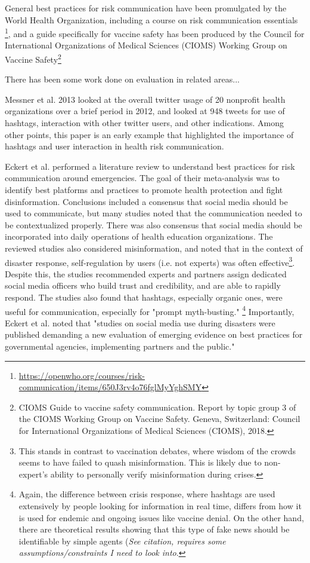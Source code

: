 \documentclass{article}
\begin{document}
General best practices for risk communication have been promulgated by the World Health Organization, including a course on risk communication essentials \footnote{\url{https://openwho.org/courses/risk-communication/items/650J3rv4o76fglMyYghSMY}}, and a guide specifically for vaccine safety has been produced by the Council for International Organizations of Medical Sciences (CIOMS) Working Group on Vaccine Safety\footnote{CIOMS Guide to vaccine safety communication. Report by topic group 3 of the CIOMS Working Group on Vaccine Safety. Geneva, Switzerland: Council for International Organizations of Medical Sciences (CIOMS), 2018.} 

There has been some work done on evaluation in related areas... 

Messner et al. 2013 looked at the overall twitter usage of 20 nonprofit health organizations over a brief period in 2012, and looked at 948 tweets for use of hashtags, interaction with other twitter users, and other indications. Among other points, this paper is an early example that highlighted the importance of hashtags and user interaction in health risk communication.

Eckert et al. performed a literature review to understand best practices for risk communication around emergencies. The goal of their meta-analysis was to identify best platforms and practices to promote health protection and fight disinformation. Conclusions included a consensus that social media should be used to communicate, but many studies noted that the communication needed to be contextualized properly. There was also consensus that  social media should be incorporated into daily operations of health education organizations. The reviewed studies also considered misinformation, and noted that in the context of disaster response, self-regulation by users (i.e. not experts) was often effective\footnote{This stands in contrast to vaccination debates, where wisdom of the crowds seems to have failed to quash misinformation. This is likely due to non-expert's ability to personally verify misinformation during crises.}. Despite this, the studies recommended experts and partners assign dedicated social media officers who build trust and credibility, and are able to rapidly respond. The studies also found that hashtags, especially organic ones, were useful for communication, especially for "prompt myth-busting."
\footnote{Again, the difference between crisis response, where hashtags are used extensively by people looking for information in real time, differs from how it is used for endemic and ongoing issues like vaccine denial. On the other hand, there are theoretical results showing that this type of fake news should be identifiable by simple agents (\textit{See citation, requires some assumptions/constraints I need to look into}\cite{Aymanns2017}.} Importantly, Eckert et al. noted that "studies on social media use during disasters were published demanding a new evaluation of emerging evidence on best practices for governmental agencies, implementing partners and the public." \cite{Eckert2017}
\end{document}

